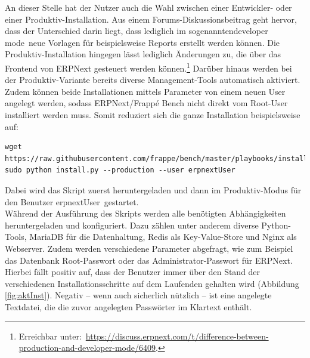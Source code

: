 An dieser Stelle hat der Nutzer auch die Wahl zwischen einer Entwickler- oder einer Produktiv-Installation. Aus einem Forums-Diskussionsbeitrag geht hervor, dass der Unterschied darin liegt, dass lediglich im sogenannten\glqq developer mode\grqq\ neue Vorlagen für beispielsweise Reports erstellt werden können. Die Produktiv-Installation hingegen lässt lediglich Änderungen zu, die über das Frontend von ERPNext gesteuert werden können.\footnote{Erreichbar unter:\ \url{https://discuss.erpnext.com/t/difference-between-production-and-developer-mode/6409}.} Darüber hinaus werden bei der Produktiv-Variante bereits diverse Management-Tools automatisch aktiviert. \\
Zudem können beide Installationen mittels Parameter von einem neuen User angelegt werden, sodass ERPNext/Frappé Bench nicht direkt vom Root-User installiert werden muss.
Somit reduziert sich die ganze Installation beispielsweise auf: \\
  \begin{verbatim}
wget https://raw.githubusercontent.com/frappe/bench/master/playbooks/install.py
sudo python install.py --production --user erpnextUser
\end{verbatim}
Dabei wird das Skript zuerst heruntergeladen und dann im Produktiv-Modus für den Benutzer \glqq erpnextUser\grqq\ gestartet. \\
Während der Ausführung des Skripts werden alle benötigten Abhängigkeiten heruntergeladen und konfiguriert. Dazu zählen unter anderem diverse Python-Tools, MariaDB für die Datenhaltung, Redis als Key-Value-Store und Nginx als Webserver. Zudem werden verschiedene Parameter abgefragt, wie zum Beispiel das Datenbank Root-Passwort oder das Administrator-Passwort für ERPNext. Hierbei fällt positiv auf, dass der Benutzer immer über den Stand der verschiedenen Installationsschritte auf dem Laufenden gehalten wird (\vgl Abbildung \ref{fig:aktInst}). Negativ – wenn auch sicherlich nützlich – ist eine angelegte Textdatei, die die zuvor angelegten Passwörter im Klartext enthält.
